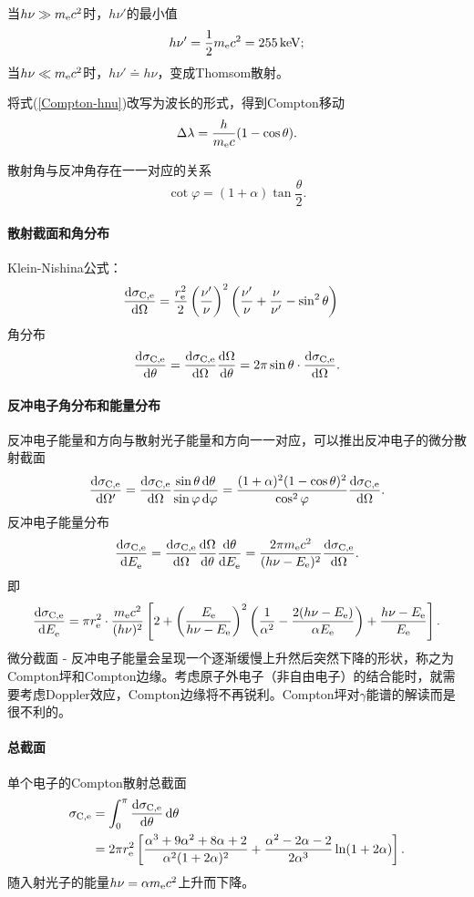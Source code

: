当$h\nu\gg m_\mathrm e c^2$时，$h\nu'$的最小值
\[
	h\nu'=\frac12m_\mathrm e c^2=\SI{255}{keV};
\]
当$h\nu\ll m_\mathrm e c^2$时，$h\nu'\doteq h\nu$，变成Thomsom散射。

将式(\ref{Compton-hnu})改写为波长的形式，得到Compton移动
\begin{align}
	\Delta\lambda=\frac h{m_\mathrm e c}(1-\cos\theta).
\end{align}

散射角与反冲角存在一一对应的关系
\[
	\cot\varphi=(1+\alpha)\tan\frac\theta{2}.
\]

\paragraph{散射截面和角分布}
Klein-Nishina公式：
\begin{align*}
	\frac{\mathrm{d}^{\;\!\!}\sigma_{\mathrm C,\mathrm e}}{\mathrm{d} \Omega^{\;\!\!}}&=\frac{r_\mathrm e^2}2\left(\frac{\nu'}\nu\right)^2\left(\frac{\nu'}\nu+\frac\nu{\nu'}-\sin^2\theta\right)
\end{align*}
角分布
\[
	\dv{\sigma_{\mathrm C,\elc}}\theta=\dv{\sigma_{\mathrm C,\elc}}\Omega\dv\Omega\theta=2\pi\sin\theta\cdot\dv{\sigma_{\mathrm C,\elc}}\Omega.
\]
\paragraph{反冲电子角分布和能量分布}
反冲电子能量和方向与散射光子能量和方向一一对应，可以推出反冲电子的微分散射截面
\[
	\dv{\sigma_{\mathrm C,\elc}}{\Omega'}=\dv{\sigma_{\mathrm C,\elc}}\Omega\frac{\sin\theta\d\theta}{\sin\varphi\d\varphi}=\frac{(1+\alpha)^2(1-\cos\theta)^2}{\cos^2\varphi}\dv{\sigma_{\mathrm C,\elc}}\Omega.
\]
反冲电子能量分布
\[
	\dv{\sigma_{\mathrm C,\elc}}{E_\elc}=\dv{\sigma_{\mathrm C,\elc}}\Omega\dv\Omega\theta\dv\theta{E_\elc}=\frac{2\pi m_\elc c^2}{(h\nu-E_\elc)^2}\dv{\sigma_{\mathrm C,\elc}}\Omega.
\]
即
\[
	\frac{\mathrm{d}^{\;\!\!}\sigma_{\mathrm C,\mathrm e}}{\mathrm{d} E_\mathrm e^{\;\!\!}}=\pi r_\mathrm e^2\cdot\frac{m_\mathrm e c^2}{(h\nu)^2}\left[2+\left(\frac{E_\mathrm e}{h\nu-E_\mathrm e}\right)^2\left(\frac1{\alpha^2}-\frac{2(h\nu-E_\mathrm e)}{\alpha E_\mathrm e}\right)+\frac{h\nu-E_\mathrm e}{E_\mathrm e}\right].
\]
微分截面 - 反冲电子能量会呈现一个逐渐缓慢上升然后突然下降的形状，称之为Compton坪和Compton边缘。考虑原子外电子（非自由电子）的结合能时，就需要考虑Doppler效应，Compton边缘将不再锐利。Compton坪对$\gamma$能谱的解读而是很不利的。

\paragraph{总截面}单个电子的Compton散射总截面
\begin{align*}
	\sigma_{\mathrm C,\mathrm e}&=\int_0^\pi\frac{\mathrm{d}^{\;\!\!}\sigma_{\mathrm C,\mathrm e}}{\mathrm{d} \theta^{\;\!\!}}\mathop{}\!\mathrm{d}\theta\\
	&=2\pi r_\mathrm e^2\left[\frac{\alpha^3+9\alpha^2+8\alpha+2}{\alpha^2(1+2\alpha)^2}+\frac{\alpha^2-2\alpha-2}{2\alpha^3}\ln(1+2\alpha)\right].
\end{align*}
随入射光子的能量$h\nu=\alpha m_\mathrm e c^2$上升而下降。

